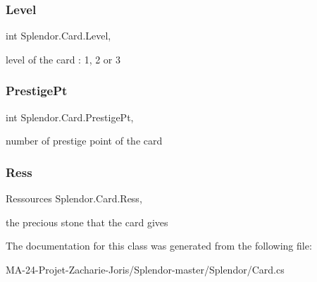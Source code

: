 \mbox{\label{class_splendor_1_1_card_aadc9953aeb322c82e04fbd9b5a3b996d}} 
\subsubsection{\texorpdfstring{Level}{Level}}
{\footnotesize\ttfamily int Splendor.\+Card.\+Level\hspace{0.3cm}{\ttfamily [get]}, {\ttfamily [set]}}



level of the card \+: 1, 2 or 3 

\mbox{\label{class_splendor_1_1_card_a117119ceac083b7b7d39f11e5bbd7225}} 
\subsubsection{\texorpdfstring{Prestige\+Pt}{PrestigePt}}
{\footnotesize\ttfamily int Splendor.\+Card.\+Prestige\+Pt\hspace{0.3cm}{\ttfamily [get]}, {\ttfamily [set]}}



number of prestige point of the card 

\mbox{\label{class_splendor_1_1_card_afcfaa7ea5072b3cd30c04adddc8dd5c7}} 
\subsubsection{\texorpdfstring{Ress}{Ress}}
{\footnotesize\ttfamily Ressources Splendor.\+Card.\+Ress\hspace{0.3cm}{\ttfamily [get]}, {\ttfamily [set]}}



the precious stone that the card gives 



The documentation for this class was generated from the following file\+:\begin{DoxyCompactItemize}
\item 
M\+A-\/24-\/\+Projet-\/\+Zacharie-\/\+Joris/\+Splendor-\/master/\+Splendor/Card.\+cs\end{DoxyCompactItemize}
